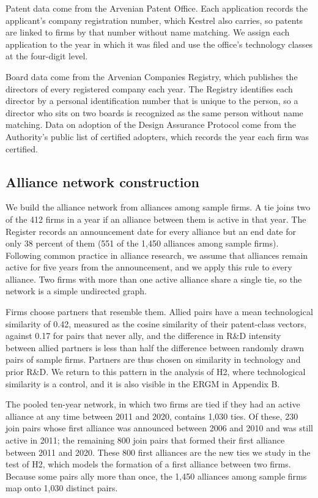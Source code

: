 \documentclass[12pt]{article}
\begin{document}
Patent data come from the Arvenian Patent Office. Each application records the applicant's company registration number, which Kestrel also carries, so patents are linked to firms by that number without name matching. We assign each application to the year in which it was filed and use the office's technology classes at the four-digit level.

Board data come from the Arvenian Companies Registry, which publishes the directors of every registered company each year. The Registry identifies each director by a personal identification number that is unique to the person, so a director who sits on two boards is recognized as the same person without name matching. Data on adoption of the Design Assurance Protocol come from the Authority's public list of certified adopters, which records the year each firm was certified.

\subsection{Alliance network construction}

We build the alliance network from alliances among sample firms. A tie joins two of the 412 firms in a year if an alliance between them is active in that year. The Register records an announcement date for every alliance but an end date for only 38 percent of them (551 of the 1,450 alliances among sample firms). Following common practice in alliance research, we assume that alliances remain active for five years from the announcement, and we apply this rule to every alliance. Two firms with more than one active alliance share a single tie, so the network is a simple undirected graph.

Firms choose partners that resemble them. Allied pairs have a mean technological similarity of 0.42, measured as the cosine similarity of their patent-class vectors, against 0.17 for pairs that never ally, and the difference in R\&D intensity between allied partners is less than half the difference between randomly drawn pairs of sample firms. Partners are thus chosen on similarity in technology and prior R\&D. We return to this pattern in the analysis of H2, where technological similarity is a control, and it is also visible in the ERGM in Appendix B.

The pooled ten-year network, in which two firms are tied if they had an active alliance at any time between 2011 and 2020, contains 1,030 ties. Of these, 230 join pairs whose first alliance was announced between 2006 and 2010 and was still active in 2011; the remaining 800 join pairs that formed their first alliance between 2011 and 2020. These 800 first alliances are the new ties we study in the test of H2, which models the formation of a first alliance between two firms. Because some pairs ally more than once, the 1,450 alliances among sample firms map onto 1,030 distinct pairs.
\end{document}
